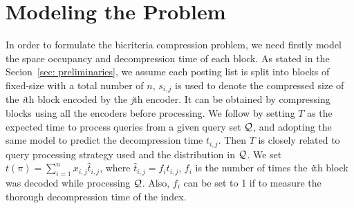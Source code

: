 \documentclass{sig-alternate-05-2015}
\begin{document}

\section{Modeling the Problem}

In order to formulate the bicriteria compression problem, we need firstly model the space occupancy and decompression time of each block.
As stated in the Secion~\ref{sec: preliminaries}, we assume each posting list is split into blocks of fixed-size with a total number of $ n $, $ s_{i,j} $ is used to denote the compressed size of the \textit{i}th block encoded by the \textit{j}th encoder.
It can be obtained by compressing blocks using all the encoders before processing.
We follow \cite{ottaviano2015optimal} by setting $ T $ as the expected time to process queries from a given query set $ \cal Q $, and adopting the same model to predict the decompression time $ t_{i,j} $.
Then $ T $ is closely related to query processing strategy used and the distribution in $ \cal Q $.
We set $ t(\pi) = \sum_{i=1}^{n}x_{i,j}\hat{t}_{i,j} $, where $ \hat{t}_{i,j}=f_i t_{i,j} $, $ f_i $ is the number of times the \textit{i}th block was decoded while processing $ \cal Q $.
Also, $ f_i $ can be set to 1 if to measure the thorough decompression time of the index.
\end{document}
